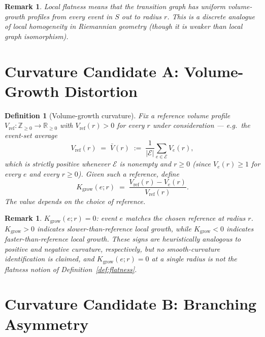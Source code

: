 \documentclass[12pt]{article}
\newtheorem{definition}[theorem]{Definition}
\newtheorem{remark}[theorem]{Remark}
\newcommand{\Ecal}{\mathcal{E}}
\begin{document}
\begin{remark}
Local flatness means that the transition graph has uniform volume-growth profiles from every event in $S$ out to radius $r$. This is a discrete analogue of local homogeneity in Riemannian geometry (though it is weaker than local graph isomorphism).
\end{remark}

\section{Curvature Candidate A: Volume-Growth Distortion}\label{sec:curv_A}

\begin{definition}[Volume-growth curvature]\label{def:Kgrow}
Fix a reference volume profile $V_{\mathrm{ref}} : \mathbb{Z}_{\geq 0} \to \mathbb{R}_{\geq 0}$ with $V_{\mathrm{ref}}(r) > 0$ for every $r$ under consideration --- e.g.\ the event-set average
\[
    V_{\mathrm{ref}}(r) \;=\; \bar V(r) \;:=\; \frac{1}{|\Ecal|} \sum_{e \in \Ecal} V_e(r),
\]
which is strictly positive whenever $\Ecal$ is nonempty and $r \geq 0$ (since $V_e(r) \geq 1$ for every $e$ and every $r \geq 0$). Given such a reference, define
\begin{equation}\label{eq:Kgrow}
    K_{\mathrm{grow}}(e; r) \;=\; \frac{V_{\mathrm{ref}}(r) - V_e(r)}{V_{\mathrm{ref}}(r)}.
\end{equation}
The value depends on the choice of reference.
\end{definition}

\begin{remark}
$K_{\mathrm{grow}}(e; r) = 0$: event $e$ matches the chosen reference at radius $r$. $K_{\mathrm{grow}} > 0$ indicates slower-than-reference local growth, while $K_{\mathrm{grow}} < 0$ indicates faster-than-reference local growth. These signs are heuristically analogous to positive and negative curvature, respectively, but no smooth-curvature identification is claimed, and $K_{\mathrm{grow}}(e; r) = 0$ at a single radius is not the flatness notion of Definition~\ref{def:flatness}.
\end{remark}

\section{Curvature Candidate B: Branching Asymmetry}\label{sec:curv_B}
\end{document}
